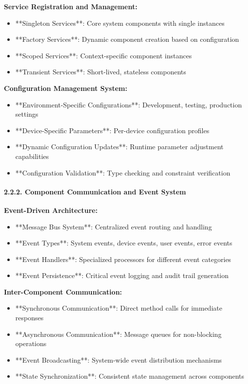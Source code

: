\documentclass[12pt,a4paper]{article}
\begin{document}
\textbf{Service Registration and Management:}

\begin{itemize}
\item **Singleton Services**: Core system components with single instances
\item **Factory Services**: Dynamic component creation based on configuration
\item **Scoped Services**: Context-specific component instances
\item **Transient Services**: Short-lived, stateless components

\end{itemize}
\textbf{Configuration Management System:}

\begin{itemize}
\item **Environment-Specific Configurations**: Development, testing, production settings
\item **Device-Specific Parameters**: Per-device configuration profiles
\item **Dynamic Configuration Updates**: Runtime parameter adjustment capabilities
\item **Configuration Validation**: Type checking and constraint verification

\end{itemize}
\paragraph{2.2.2. Component Communication and Event System}

\textbf{Event-Driven Architecture:}

\begin{itemize}
\item **Message Bus System**: Centralized event routing and handling
\item **Event Types**: System events, device events, user events, error events
\item **Event Handlers**: Specialized processors for different event categories
\item **Event Persistence**: Critical event logging and audit trail generation

\end{itemize}
\textbf{Inter-Component Communication:}

\begin{itemize}
\item **Synchronous Communication**: Direct method calls for immediate responses
\item **Asynchronous Communication**: Message queues for non-blocking operations
\item **Event Broadcasting**: System-wide event distribution mechanisms
\item **State Synchronization**: Consistent state management across components

\end{itemize}
\end{document}
